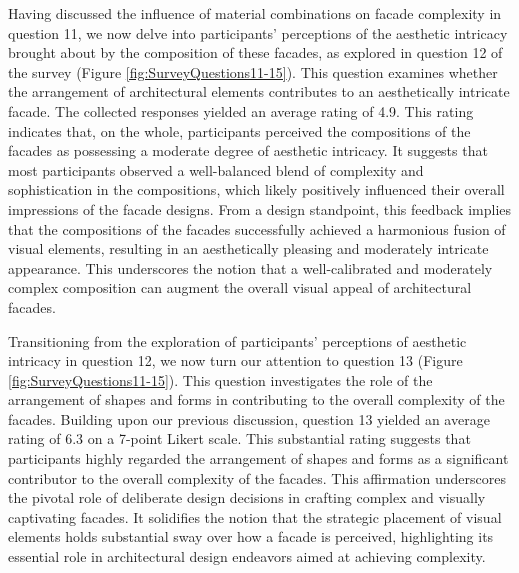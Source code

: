 Having discussed the influence of material combinations on facade complexity in question 11, we now delve into participants' perceptions of the aesthetic intricacy brought about by the composition of these facades, as explored in question 12 of the survey (Figure \ref{fig:SurveyQuestions11-15}). This question examines whether the arrangement of architectural elements contributes to an aesthetically intricate facade.
The collected responses yielded an average rating of 4.9. This rating indicates that, on the whole, participants perceived the compositions of the facades as possessing a moderate degree of aesthetic intricacy.
It suggests that most participants observed a well-balanced blend of complexity and sophistication in the compositions, which likely positively influenced their overall impressions of the facade designs.
From a design standpoint, this feedback implies that the compositions of the facades successfully achieved a harmonious fusion of visual elements, resulting in an aesthetically pleasing and moderately intricate appearance.
This underscores the notion that a well-calibrated and moderately complex composition can augment the overall visual appeal of architectural facades.


Transitioning from the exploration of participants' perceptions of aesthetic intricacy in question 12, we now turn our attention to question 13 (Figure \ref{fig:SurveyQuestions11-15}). This question investigates the role of the arrangement of shapes and forms in contributing to the overall complexity of the facades.
Building upon our previous discussion, question 13 yielded an average rating of 6.3 on a 7-point Likert scale.
This substantial rating suggests that participants highly regarded the arrangement of shapes and forms as a significant contributor to the overall complexity of the facades.
This affirmation underscores the pivotal role of deliberate design decisions in crafting complex and visually captivating facades.
It solidifies the notion that the strategic placement of visual elements holds substantial sway over how a facade is perceived, highlighting its essential role in architectural design endeavors aimed at achieving complexity.


